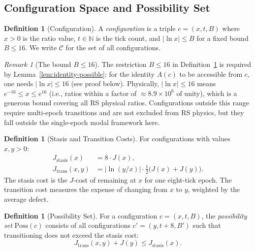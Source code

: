 \documentclass[12pt,a4paper]{article}
\theoremstyle{definition}
\newtheorem{definition}[theorem]{Definition}
\theoremstyle{remark}
\newtheorem{remark}[theorem]{Remark}
\begin{document}
\subsection{Configuration Space and Possibility Set}

\begin{definition}[Configuration]
\label{def:config}
A \emph{configuration} is a triple $c = (x, t, B)$ where $x > 0$ is
the ratio value, $t \in \mathbb{N}$ is the tick count, and
$|\!\ln x| \leq B$ for a fixed bound $B \leq 16$.  We write
$\mathcal{C}$ for the set of all configurations.
\end{definition}

\begin{remark}[The bound $B \leq 16$]
The restriction $B \leq 16$ in Definition~\ref{def:config} is required
by Lemma~\ref{lem:identity-possible}: for the identity $A(c)$ to be
accessible from $c$, one needs $|\!\ln x| \leq 16$ (see proof below).
Physically, $|\!\ln x| \leq 16$ means $e^{-16} \leq x \leq e^{16}$
(i.e., ratios within a factor of $\approx 8.9 \times 10^6$ of unity),
which is a generous bound covering all RS physical ratios.  Configurations
outside this range require multi-epoch transitions and are not excluded
from RS physics, but they fall outside the single-epoch modal framework
here.
\end{remark}

\begin{definition}[Stasis and Transition Costs]
\label{def:costs}
For configurations with values $x, y > 0$:
\begin{align}
  J_{\mathrm{stasis}}(x) &= 8 \cdot J(x), \\
  J_{\mathrm{trans}}(x, y) &= |\!\ln(y/x)| \cdot
  \tfrac{1}{2}\bigl(J(x) + J(y)\bigr).
\end{align}
The stasis cost is the $J$-cost of remaining at $x$ for one eight-tick
epoch.  The transition cost measures the expense of changing from $x$
to $y$, weighted by the average defect.
\end{definition}

\begin{definition}[Possibility Set]
\label{def:poss-set}
For a configuration $c = (x, t, B)$, the \emph{possibility set}
$\mathrm{Poss}(c)$ consists of all configurations $c' = (y, t{+}8, B')$
such that transitioning does not exceed the stasis cost:
\begin{equation}
  J_{\mathrm{trans}}(x, y) + J(y) \leq J_{\mathrm{stasis}}(x).
\end{equation}
\end{definition}
\end{document}
